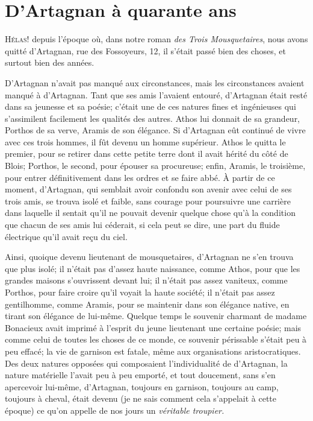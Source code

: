 \chapter{D'Artagnan à quarante ans}

\lettrine{H}{élas!} depuis l'époque où, dans notre roman \textit{des Trois Mousquetaires}, nous avons quitté d'Artagnan, rue des Fossoyeurs, 12, il s'était passé bien des choses, et surtout bien des années.

\zz
D'Artagnan n'avait pas manqué aux circonstances, mais les circonstances avaient manqué à d'Artagnan. Tant que ses amis l'avaient entouré, d'Artagnan était resté dans sa jeunesse et sa poésie; c'était une de ces natures fines et ingénieuses qui s'assimilent facilement les qualités des autres. Athos lui donnait de sa grandeur, Porthos de sa verve, Aramis de son élégance. Si d'Artagnan eût continué de vivre avec ces trois hommes, il fût devenu un homme supérieur. Athos le quitta le premier, pour se retirer dans cette petite terre dont il avait hérité du côté de Blois; Porthos, le second, pour épouser sa procureuse; enfin, Aramis, le troisième, pour entrer définitivement dans les ordres et se faire abbé. À partir de ce moment, d'Artagnan, qui semblait avoir confondu son avenir avec celui de ses trois amis, se trouva isolé et faible, sans courage pour poursuivre une carrière dans laquelle il sentait qu'il ne pouvait devenir quelque chose qu'à la condition que chacun de ses amis lui céderait, si cela peut se dire, une part du fluide électrique qu'il avait reçu du ciel.

Ainsi, quoique devenu lieutenant de mousquetaires, d'Artagnan ne s'en trouva que plus isolé; il n'était pas d'assez haute naissance, comme Athos, pour que les grandes maisons s'ouvrissent devant lui; il n'était pas assez vaniteux, comme Porthos, pour faire croire qu'il voyait la haute société; il n'était pas assez gentilhomme, comme Aramis, pour se maintenir dans son élégance native, en tirant son élégance de lui-même. Quelque temps le souvenir charmant de madame Bonacieux avait imprimé à l'esprit du jeune lieutenant une certaine poésie; mais comme celui de toutes les choses de ce monde, ce souvenir périssable s'était peu à peu effacé; la vie de garnison est fatale, même aux organisations aristocratiques. Des deux natures opposées qui composaient l'individualité de d'Artagnan, la nature matérielle l'avait peu à peu emporté, et tout doucement, sans s'en apercevoir lui-même, d'Artagnan, toujours en garnison, toujours au camp, toujours à cheval, était devenu (je ne sais comment cela s'appelait à cette époque) ce qu'on appelle de nos jours un \textit{véritable troupier.}

